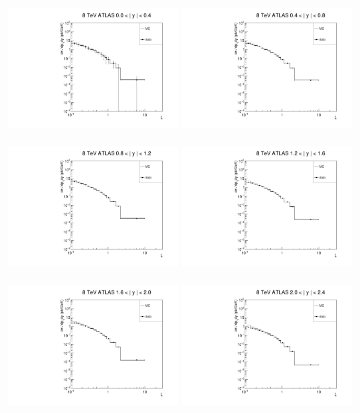 \documentclass{article}
\begin{document}
\begin{figure}[h!]
\centering
\includegraphics[width = 0.4\textwidth]{xi_8_A_y1.pdf}
\includegraphics[width = 0.4\textwidth]{xi_8_A_y2.pdf}

\includegraphics[width = 0.4\textwidth]{xi_8_A_y3.pdf}
\includegraphics[width = 0.4\textwidth]{xi_8_A_y4.pdf}

\includegraphics[width = 0.4\textwidth]{xi_8_A_y5.pdf}
\includegraphics[width = 0.4\textwidth]{xi_8_A_y6.pdf}
\end{figure}
\end{document}
